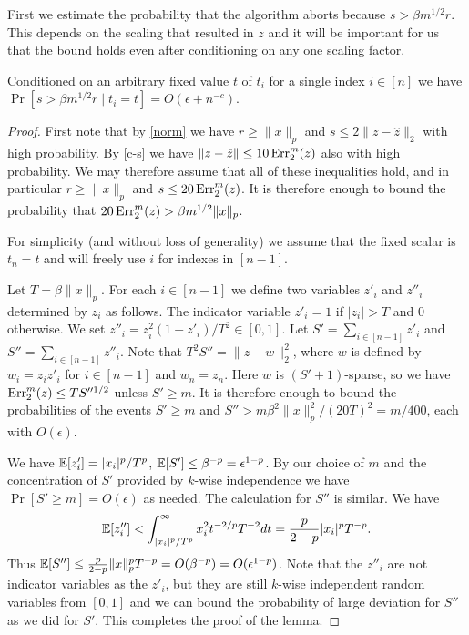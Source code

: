 First we estimate the probability that the algorithm aborts because $s>\beta
m^{1/2}r$. This depends on the scaling that resulted in $z$ and it will be important
for us that the bound holds even after conditioning on any one scaling factor.

\begin{lemma}\label{abort}
Conditioned on an arbitrary fixed value $t$ of $t_i$ for a single index
$i\in[n]$ we have $\Pr[s>\beta m^{1/2}r\mid t_i=t]=O(\epsilon+n^{-c})$.
\end{lemma}

\begin{proof}
First note that by \autoref{norm} we have $r\ge\|x\|_p$ and
$s\le2\|z-\hat z\|_2$ with high probability. By
\autoref{c-s} we have $\|z-\hat z\|\le10\operatorname{Err}_2^m(z)$ also
with high probability. We may therefore assume that all of these inequalities
hold, and in particular
$r\ge\|x\|_p$ and $s\le20\operatorname{Err}_2^m(z)$. It is therefore enough to bound the
probability that $20\operatorname{Err}_2^m(z)>\beta m^{1/2}\|x\|_p$.

For simplicity (and without loss of generality) we assume that the fixed
scalar is $t_n=t$ and will freely use $i$ for indexes in $[n-1]$.

Let $T=\beta\|x\|_p$. For each $i\in[n-1]$ we define
two variables $z'_i$ and $z''_i$ determined by $z_i$ as follows. The indicator
variable $z'_i=1$ if $|z_i|>T$ and $0$ otherwise. We set
$z''_i=z_i^2(1-z'_i)/T^2\in[0,1]$. Let $S'=\sum_{i\in[n-1]}z'_i$ and
$S''=\sum_{i\in[n-1]}z''_i$. Note that $T^2S''=\|z-w\|_2^2$, where $w$ is
defined by $w_i=z_iz'_i$ for $i\in[n-1]$ and $w_n=z_n$. Here $w$ is
$(S'+1)$-sparse, so we have $\operatorname{Err}_2^m(z)\le TS''^{1/2}$ unless $S'\ge m$.
It is therefore enough to bound the probabilities of the events
$S'\ge m$ and $S''>m\beta^2\|x\|_p^2/(20T)^2=m/400$, each with  $O(\epsilon)$.

We have $\operatorname*{\mathbb{E}}[z'_i]=|x_i|^p/T^p$, $\operatorname*{\mathbb{E}}[S']\le\beta^{-p}=\epsilon^{1-p}$. By our
choice of $m$ and the concentration of $S'$ provided by $k$-wise independence
we have $\Pr[S'\ge m]=O(\epsilon)$ as needed.
The calculation for $S''$ is similar. We have
$$\operatorname*{\mathbb{E}}[z''_i]<\int_{|x_i|^p/T^p}^\infty x_i^2t^{-2/p}T^{-2}dt=\frac
p{2-p}|x_i|^pT^{-p}.$$ Thus $\operatorname*{\mathbb{E}}[S'']\le\frac
p{2-p}\|x\|_p^pT^{-p}=O(\beta^{-p})=O(\epsilon^{1-p})$. Note that the $z''_i$
are not indicator variables as the $z'_i$, but they are still $k$-wise
independent random variables from $[0,1]$ and we can bound the probability of
large deviation for $S''$ as we did for $S'$. This completes the proof of the
lemma.
\end{proof}

